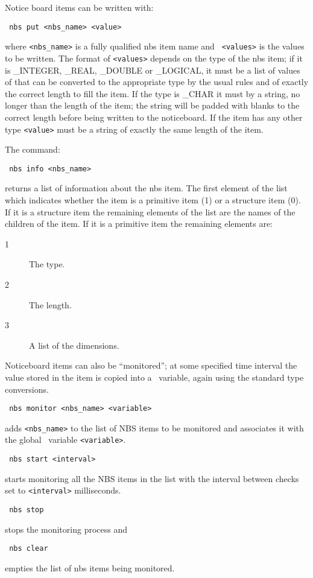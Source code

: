 Notice board items can be written with:
\begin{tquote}{\tt
nbs put <nbs\_name> <value>
}\end{tquote}
where {\tt <nbs\_name>} is a fully qualified nbs item name and {\tt 
<values>} is the values to be written. 
The format of {\tt <values>} depends on the type of the nbs item; if it
is \_INTEGER, \_REAL, \_DOUBLE or \_LOGICAL, it must be a list of values of
that can be converted to the appropriate type by the usual rules and of
exactly the correct length to fill the item. If the type is \_CHAR it must
by a string, no longer than the length of the item; the string will be padded
with blanks to the correct length before being written to the noticeboard. If
the item has any other type {\tt <value>} must be a string of exactly the same
length of the item.

The command:
\begin{tquote}{\tt
nbs info <nbs\_name>
}\end{tquote}
returns a list of information about the nbs item. The first element of the list
which indicates whether the item is a primitive item (1) or a structure item
(0). If it is a structure item the remaining elements of the list are the names
of the children of the item. If it is a primitive item the remaining elements
are:
\begin{description}
\item[1] The type.
\item[2] The length. 
\item[3] A list of the dimensions. 
\end{description}

Noticeboard items can also be ``monitored''; at some specified time 
interval the 
value stored in the item is copied into a \Tcl\ variable, again using the
standard type conversions.
\begin{tquote}{\tt
nbs monitor <nbs\_name> <variable>
}\end{tquote}
adds {\tt <nbs\_name>} to the list of NBS items to be monitored and 
associates it with the global \Tcl\ variable {\tt <variable>}.
\begin{tquote}{\tt
nbs start <interval>
}\end{tquote}
starts monitoring all the NBS items in the list with the interval between 
checks set to {\tt <interval>} milliseconds.

\begin{tquote}{\tt
nbs stop
}\end{tquote}
stops the monitoring process and
\begin{tquote}{\tt
nbs clear
}\end{tquote}
empties the list of nbs items being monitored.

